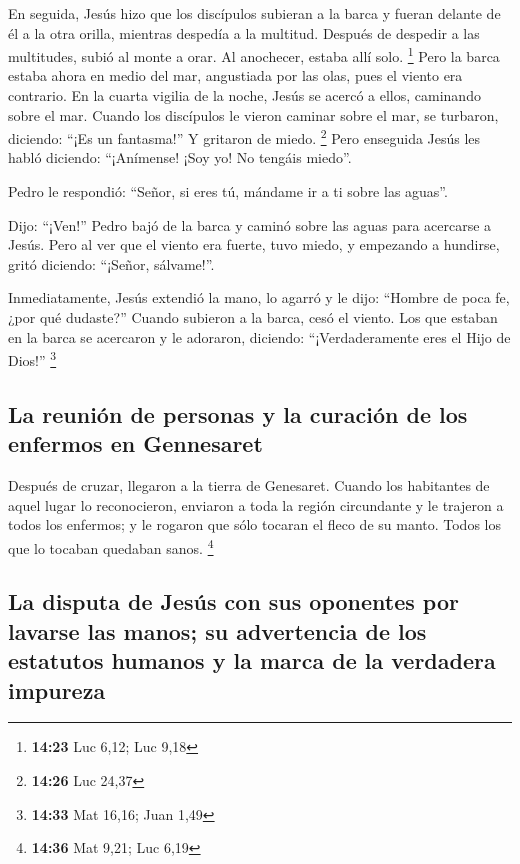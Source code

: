  En seguida, Jesús hizo que los discípulos subieran a la
barca y fueran delante de él a la otra orilla, mientras despedía a la
multitud.  Después de despedir a las multitudes, subió al
monte a orar. Al anochecer, estaba allí solo. \footnote{\textbf{14:23}
  Luc 6,12; Luc 9,18}  Pero la barca estaba ahora en
medio del mar, angustiada por las olas, pues el viento era contrario.
 En la cuarta vigilia de la noche, Jesús se acercó a
ellos, caminando sobre el mar.  Cuando los discípulos le
vieron caminar sobre el mar, se turbaron, diciendo: ``¡Es un fantasma!''
Y gritaron de miedo. \footnote{\textbf{14:26} Luc 24,37} 
Pero enseguida Jesús les habló diciendo: ``¡Anímense! ¡Soy yo! No
tengáis miedo''.

 Pedro le respondió: ``Señor, si eres tú, mándame ir a ti
sobre las aguas''.

 Dijo: ``¡Ven!'' Pedro bajó de la barca y caminó sobre
las aguas para acercarse a Jesús.  Pero al ver que el
viento era fuerte, tuvo miedo, y empezando a hundirse, gritó diciendo:
``¡Señor, sálvame!''.

 Inmediatamente, Jesús extendió la mano, lo agarró y le
dijo: ``Hombre de poca fe, ¿por qué dudaste?''  Cuando
subieron a la barca, cesó el viento.  Los que estaban en
la barca se acercaron y le adoraron, diciendo: ``¡Verdaderamente eres el
Hijo de Dios!'' \footnote{\textbf{14:33} Mat 16,16; Juan 1,49}

\hypertarget{la-reuniuxf3n-de-personas-y-la-curaciuxf3n-de-los-enfermos-en-gennesaret}{%
\subsection{La reunión de personas y la curación de los enfermos en
Gennesaret}\label{la-reuniuxf3n-de-personas-y-la-curaciuxf3n-de-los-enfermos-en-gennesaret}}

 Después de cruzar, llegaron a la tierra de Genesaret.
 Cuando los habitantes de aquel lugar lo reconocieron,
enviaron a toda la región circundante y le trajeron a todos los
enfermos;  y le rogaron que sólo tocaran el fleco de su
manto. Todos los que lo tocaban quedaban sanos. \footnote{\textbf{14:36}
  Mat 9,21; Luc 6,19}

\hypertarget{la-disputa-de-jesuxfas-con-sus-oponentes-por-lavarse-las-manos-su-advertencia-de-los-estatutos-humanos-y-la-marca-de-la-verdadera-impureza}{%
\subsection{La disputa de Jesús con sus oponentes por lavarse las manos;
su advertencia de los estatutos humanos y la marca de la verdadera
impureza}\label{la-disputa-de-jesuxfas-con-sus-oponentes-por-lavarse-las-manos-su-advertencia-de-los-estatutos-humanos-y-la-marca-de-la-verdadera-impureza}}

